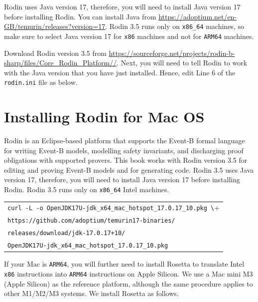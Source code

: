 \documentclass{article} %
\newcommand{\eb}{\textsf{Event-B}\xspace}
\newcommand{\continuationR}{\rotatebox[origin=c]{-90}{$\curvearrowright$}}
\begin{document}
Rodin uses Java version 17, therefore, you will need to install Java version 17 before installing Rodin. You can install Java from  \href{https://adoptium.net/en-GB/temurin/releases?version=17} {https://\-adoptium.\-net/\-en-\-GB/\-temurin/\-releases?\-version=17}. Rodin 3.5 runs only on \texttt{x86\_64} machines, so make sure to select Java version 17 for \texttt{x86} machines and not for \verb+ARM64+ machines.

Download Rodin version 3.5 from \href{https://sourceforge.net/projects/rodin-b-sharp/files/Core_Rodin_Platform/3.5/} {https://\-source\-forge.\-net/\-pro\-jects/\-rodin\--b-\-sharp/\-files/\-Core\_\-Rodin\_\-Plat\-form//}. Next, you will need to tell Rodin to work with the Java version that you have just installed. Hence, edit Line 6 of the \verb+rodin.ini+ file as below.

\medskip
{}
\medskip


\section{Installing Rodin for Mac OS}
\label{sec_rodin_mac}

Rodin is an Eclipse-based platform that supports the \eb formal language for writing \eb models, modelling safety invariants, and discharging proof obligations with supported provers. This book works with Rodin version 3.5 for editing and proving \eb models and for generating code. Rodin 3.5 uses Java version 17, therefore, you will need to install Java version 17 before installing Rodin. Rodin 3.5 runs only on \texttt{x86\_64} Intel machines.

\medskip
\begin{tabular}{l}
\verb+curl -L -o OpenJDK17U-jdk_x64_mac_hotspot_17.0.17_10.pkg \+\\
\quad\quad\verb|https://github.com/adoptium/temurin17-binaries/|~~~\continuationR\\
\quad\quad\verb|releases/download/jdk-17.0.17+10/|~~~\continuationR\\
\verb|OpenJDK17U-jdk_x64_mac_hotspot_17.0.17_10.pkg|\\
\end{tabular}
\medskip

If your Mac is \verb+ARM64+, you will further need to install Rosetta to translate Intel \texttt{x86} instructions into \verb+ARM64+ instructions on Apple Silicon. We use a Mac mini M3 (Apple Silicon) as the reference platform, although the same procedure applies to other M1/M2/M3 systems. We install Rosetta as follows. 
\end{document}
